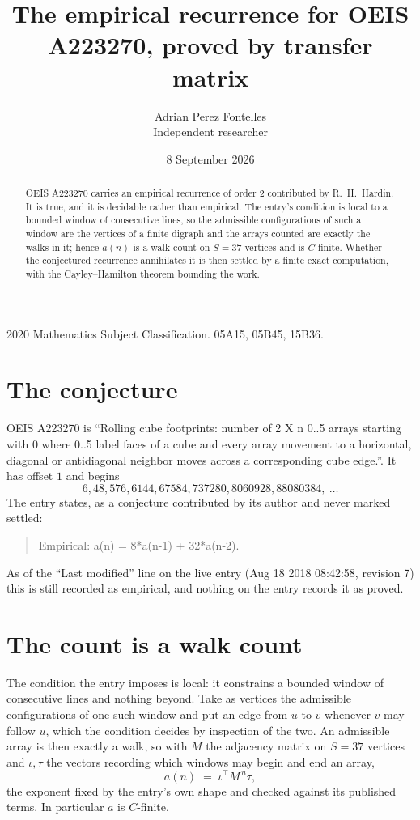 \documentclass[11pt,a4paper]{article}
\title{The empirical recurrence for OEIS A223270, proved by transfer matrix}
\author{Adrian Perez Fontelles\\ \small Independent researcher}
\date{8 September 2026}
\theoremstyle{plain}
\theoremstyle{definition}
\begin{document}
\maketitle

\begin{abstract}
OEIS A223270 carries an empirical recurrence of order $2$ contributed by R.~H.~Hardin. It is
true, and it is decidable rather than empirical. The entry's condition is local to a bounded window of consecutive lines, so
the admissible configurations of such a window are the vertices of a finite digraph and the
arrays counted are exactly the walks in it; hence $a(n)$ is a walk count on $S=37$ vertices
and is $C$-finite. Whether the conjectured recurrence annihilates it is then settled by a
finite exact computation, with the Cayley--Hamilton theorem bounding the work.
\end{abstract}

\noindent\small 2020 Mathematics Subject Classification. 05A15, 05B45, 15B36.\normalsize

\section{The conjecture}

OEIS A223270 is ``Rolling cube footprints: number of 2 X n 0..5 arrays starting with 0 where 0..5 label faces of a cube and every array movement to a horizontal, diagonal or antidiagonal neighbor moves across a corresponding cube edge.''. It has offset $1$ and begins
\[
6, 48, 576, 6144, 67584, 737280, 8060928, 88080384,\ \dots
\]
The entry states, as a conjecture contributed by its author and never marked settled:
\begin{quote}
Empirical: a(n) = 8*a(n-1) + 32*a(n-2).
\end{quote}
As of the ``Last modified'' line on the live entry (Aug 18 2018 08:42:58, revision 7) this is still
recorded as empirical, and nothing on the entry records it as proved.

\section{The count is a walk count}

The condition the entry imposes is local: it constrains a bounded window of consecutive lines and nothing beyond. Take as
vertices the admissible configurations of one such window and put an edge from $u$ to $v$
whenever $v$ may follow $u$, which the condition decides by inspection of the two. An
admissible array is then exactly a walk, so with $M$ the adjacency matrix on $S=37$ vertices
and $\iota,\tau$ the vectors recording which windows may begin and end an array,
\[
a(n)\;=\;\iota^{\!\top}M^{\,n}\tau ,
\]
the exponent fixed by the entry's own shape and checked against its published terms. In
particular $a$ is $C$-finite.
\end{document}
